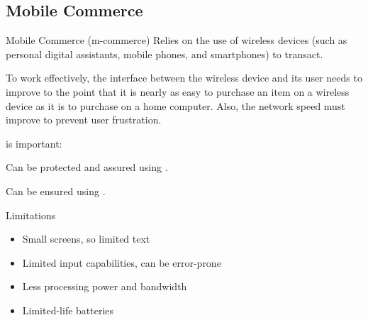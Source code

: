 \documentclass[\main/notes.tex]{subfiles}
\begin{document}
			\subsection{Mobile Commerce}
				\begin{definition}{Mobile Commerce (m-commerce)}
					Relies on the use of wireless devices (such as personal digital assistants, mobile phones, and smartphones) to transact.

					To work effectively, the interface between the wireless device and its user needs to improve to the point that it is nearly as easy to purchase an item on a wireless device as it is to purchase on a home computer. Also, the network speed must improve to prevent user frustration.

					 is important:
					\begin{indentparagraph}
						\begin{description}[nosep]
							\item[Security of the transmission itself] Can be protected and assured using .
							\item[Transaction made with the intended party] Can be ensured using .
						\end{description}
					\end{indentparagraph}
				\end{definition}
				\begin{sidenote}{Limitations}
					\begin{itemize}[nosep]
						\item Small screens, so limited text
						\item Limited input capabilities, can be error-prone
						\item Less processing power and bandwidth
						\item Limited-life batteries
					\end{itemize}
				\end{sidenote}
\end{document}
